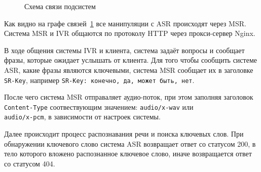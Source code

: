 \begin{figure}[h!]
    \centering
    \caption{Схема связи подсистем}
    \label{fig:schema}
\end{figure}

Как видно на графе связей~\ref{fig:schema} все манипуляции с ASR происходят через
MSR. Система MSR и IVR общаются по протоколу HTTP через прокси-сервер Nginx.

В ходе общения системы IVR и клиента, система задаёт вопросы и сообщает фразы,
которые ожидает услышать от клиента. Для того чтобы сообщить системе ASR, какие
фразы являются ключевыми, система MSR сообщает их в заголовке \texttt{SR-Key},
например \texttt{SR-Key: конечно, да, может быть, нет}.

После чего система MSR отправаляет аудио-поток, при этом заполняя заголовок
\texttt{Content-Type} соотвествующим значением: \texttt{audio/x-wav} или \\
\texttt{audio/x-pcm}, в зависимости от настроек системы.

Далее происходит процесс распознавания речи и поиска ключевых слов. При обнаружении
ключевого слово система ASR возвращает ответ со статусом 200, в тело которого
вложено распознанное ключевое слово, иначе возвращается ответ со статусом 404.
